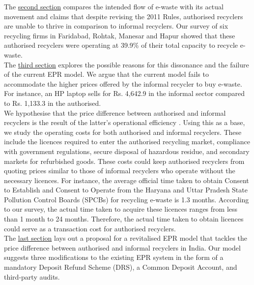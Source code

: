 \documentclass[a4paper, 12pt]{article}
\begin{document}
                   The \hyperref[sec:2]{second section} compares the intended flow of e-waste with its actual movement and claims that despite revising the 2011 Rules, authorised recyclers are unable to thrive in comparison to informal recyclers. Our survey of six recycling firms in Faridabad, Rohtak, Manesar and Hapur showed that these authorised recyclers were operating at 39.9\% of their total capacity to recycle e-waste. \\
                   
                   The \hyperref[sec:3]{third section} explores the possible reasons for this dissonance and the failure of the current EPR model. We argue that the current model fails to accommodate the higher prices offered by the informal recycler to buy e-waste. For instance, an HP laptop sells for Rs. 4,642.9 in the informal sector compared to Rs. 1,133.3 in the authorised.\\
                   
                   We hypothesise that the price difference between authorised and informal recyclers is the result of the latter’s operational efficiency \parencite{chintanreport}. Using this as a base, we study the operating costs for both authorised and informal recyclers. These include the licences required to enter the authorised recycling market, compliance with government regulations, secure disposal of hazardous residue, and secondary markets for refurbished goods. These costs could keep authorised recyclers from quoting prices similar to those of informal recyclers who operate without the necessary licences. For instance, the average official time taken to obtain Consent to Establish and Consent to Operate from the Haryana and Uttar Pradesh State Pollution Control Boards (SPCBs) for recycling e-waste is 1.3 months. According to our survey, the actual time taken to acquire these licences ranges from less than 1 month to 24 months. Therefore, the actual time taken to obtain licences could serve as a transaction cost for authorised recyclers.\\
                    
                    The \hyperref[sec:4]{last section} lays out a proposal for a revitalised EPR model that tackles the price difference between authorised and informal recyclers in India. Our model suggests three modifications to the existing EPR system in the form of a mandatory Deposit Refund Scheme (DRS), a Common Deposit Account, and third-party audits.\\
                    
\end{document}
